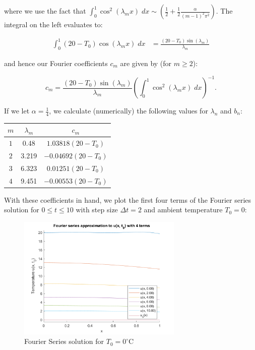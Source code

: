 \begin{solution}
    where we use the fact that $\int_{0}^{1}{\cos^2{(\lambda_m x)}\; dx} \sim \left(\frac{1}{2} + \frac{1}{2}\frac{\alpha}{(m-1)^2 \pi^2} \right)$.
    The integral on the left evaluates to:

    \begin{align*}
        \int_{0}^{1}{(20 - T_0) \cos{(\lambda_m x)}\; dx} &= \frac{(20 - T_0) \sin{(\lambda_m)}}{\lambda_m}
    \end{align*}

    and hence our Fourier coefficients $c_m$ are given by (for $m \ge 2$):

    $$
        c_m = \frac{(20 - T_0) \sin{(\lambda_m)}}{\lambda_m} \left(\int_{0}^{1}{\cos^2{(\lambda_m x)}\; dx} \right)^{-1}.
    $$

    If we let $\alpha = \frac{1}{4}$, we calculate (numerically) the following values for $\lambda_n$ and $b_n$: 

    \begin{center}
        \begin{tabular}{ ||c c c|| } 
            \hline
            $m$ & $\lambda_m$ & $c_m$                  \\ [0.5ex] 
            \hline\hline
            $1$ & 0.48        & $1.03818 (20 - T_0)$  \\ 
            \hline
            $2$ & 3.219       & $-0.04692 (20 - T_0)$ \\ 
            \hline
            $3$ & 6.323       & $0.01251 (20 - T_0)$  \\ 
            \hline
            $4$ & 9.451       & $-0.00553 (20 - T_0)$ \\ [1ex]
        \hline
        \end{tabular}
    \end{center}

    \pagebreak
    With these coefficients in hand, we plot the first four terms of the Fourier series solution for $0 \le t \le 10$
    with step size $\Delta t = 2$ and ambient temperature $T_0 = 0$:

    \begin{figure}[h]
        \centering
        \includegraphics[width=0.7\textwidth]{problem1_fourier_series_solution_4_terms_t0_0.png}
        \caption{Fourier Series solution for $T_0 = 0^{\circ}$C}
    \end{figure}


\end{solution}
